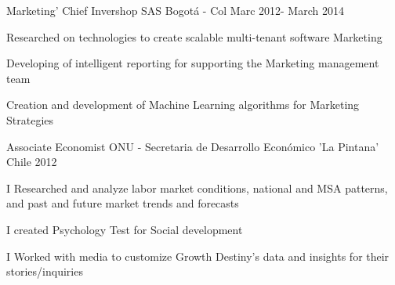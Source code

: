 \begin{cventries}

    \cventry
    {Marketing' Chief}%
    {Invershop SAS} %
    {Bogotá - Col} %
    {Marc 2012- March 2014} %
    {
    \begin{cvitems} 
     \item { Researched on technologies to create scalable multi-tenant
software Marketing}
      \item {Developing of intelligent reporting for supporting the Marketing management team}
       \item {Creation and development of Machine Learning algorithms for Marketing Strategies }
       \end{cvitems}
    }

    \cventry
    {Associate Economist}%
    {ONU - Secretaria de Desarrollo Económico 'La Pintana'} %
    {Chile} %
    {2012} %
    {
    \begin{cvitems} 
     \item { I Researched and analyze labor market conditions, national and MSA patterns, and past and future market trends and forecasts}
      \item {I created Psychology Test for Social development }
       \item {I Worked with media to customize Growth Destiny’s data and insights for their stories/inquiries}
       \end{cvitems}
    }

\end{cventries}
